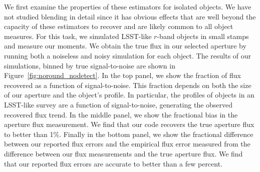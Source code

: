 \documentclass[twocolappendix, appendixfloats, numberedappendix, twocolumn, apj]{openjournal}
\begin{document}
We first examine the properties of these estimators for isolated objects. We have not
studied blending in detail since it has obvious effects that are well beyond the capacity
of these estimators to recover and are likely common to all object measures. For this task,
we simulated LSST-like $r$-band objects in small stamps and measure our moments. We obtain the
true flux in our selected aperture by running both a noiseless and noisy simulation for each
object. The results of our simulations, binned by true signal-to-noise are shown in
Figure~\ref{fig:noround_nodetect}. In the top panel, we show the fraction of flux recovered
as a function of signal-to-noise. This fraction depends on both the size of our aperture
and the object's profile. In particular, the profiles of objects in an LSST-like survey
are a function of signal-to-noise, generating the observed recovered flux trend. In the middle
panel, we show the fractional bias in the aperture flux measurement. We find that our code
recovers the true aperture flux to better than 1\%. Finally in the bottom panel, we show
the fractional difference between our reported flux errors and the empirical flux error
measured from the difference between our flux measurements and the true aperture flux. We
find that our reported flux errors are accurate to better than a few percent.
\end{document}

